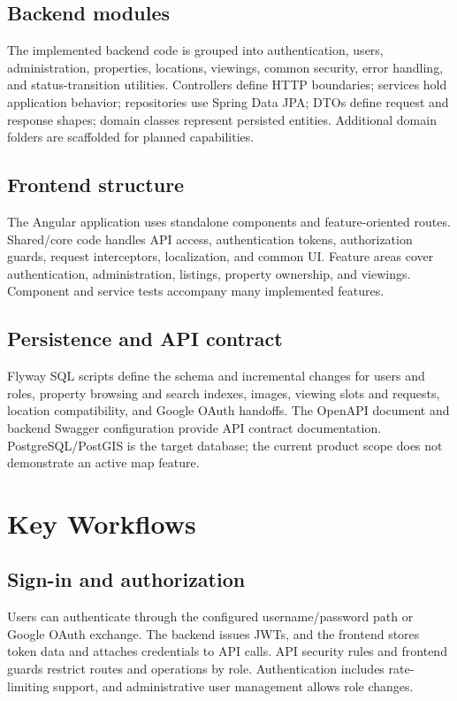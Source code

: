 \documentclass[11pt,a4paper]{article}
\begin{document}
\subsection{Backend modules}
The implemented backend code is grouped into authentication, users, administration, properties, locations, viewings, common security, error handling, and status-transition utilities. Controllers define HTTP boundaries; services hold application behavior; repositories use Spring Data JPA; DTOs define request and response shapes; domain classes represent persisted entities. Additional domain folders are scaffolded for planned capabilities.

\subsection{Frontend structure}
The Angular application uses standalone components and feature-oriented routes. Shared/core code handles API access, authentication tokens, authorization guards, request interceptors, localization, and common UI. Feature areas cover authentication, administration, listings, property ownership, and viewings. Component and service tests accompany many implemented features.

\subsection{Persistence and API contract}
Flyway SQL scripts define the schema and incremental changes for users and roles, property browsing and search indexes, images, viewing slots and requests, location compatibility, and Google OAuth handoffs. The OpenAPI document and backend Swagger configuration provide API contract documentation. PostgreSQL/PostGIS is the target database; the current product scope does not demonstrate an active map feature.

\section{Key Workflows}
\subsection{Sign-in and authorization}
Users can authenticate through the configured username/password path or Google OAuth exchange. The backend issues JWTs, and the frontend stores token data and attaches credentials to API calls. API security rules and frontend guards restrict routes and operations by role. Authentication includes rate-limiting support, and administrative user management allows role changes.
\end{document}
